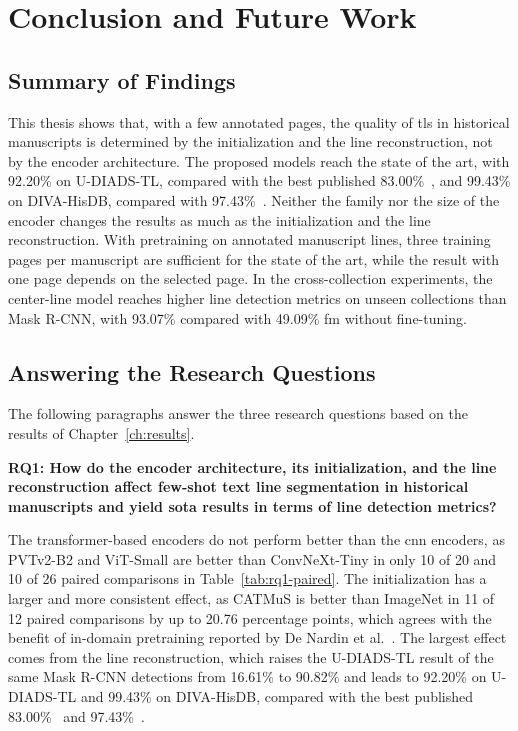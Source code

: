 \chapter{Conclusion and Future Work}
\label{ch:conclusions}

\section{Summary of Findings}
\label{sec:conclusions}

This thesis shows that, with a few annotated pages, the quality of \gls{tls} in historical manuscripts is determined by the initialization and the line reconstruction, not by the encoder architecture. The proposed models reach the state of the art, with 92.20\% on U-DIADS-TL, compared with the best published 83.00\%~\cite{Zottin_2025_FEST}, and 99.43\% on DIVA-HisDB, compared with 97.43\%~\cite{signals3030032}. Neither the family nor the size of the encoder changes the results as much as the initialization and the line reconstruction. With pretraining on annotated manuscript lines, three training pages per manuscript are sufficient for the state of the art, while the result with one page depends on the selected page. In the cross-collection experiments, the center-line model reaches higher line detection metrics on unseen collections than Mask R-CNN, with 93.07\% compared with 49.09\% \gls{fm} without fine-tuning.

\section{Answering the Research Questions}
\label{sec:disc-answers}\label{sec:disc-interpretation}\label{sec:disc-initialization}\label{sec:disc-representations}\label{sec:disc-previous}

The following paragraphs answer the three research questions based on the results of Chapter~\ref{ch:results}.

\textbf{RQ1: How do the encoder architecture, its initialization, and the line reconstruction affect few-shot text line segmentation in historical manuscripts and yield \gls{sota} results in terms of line detection metrics?}

The transformer-based encoders do not perform better than the \gls{cnn} encoders, as PVTv2-B2 and ViT-Small are better than ConvNeXt-Tiny in only 10 of 20 and 10 of 26 paired comparisons in Table~\ref{tab:rq1-paired}. The initialization has a larger and more consistent effect, as CATMuS is better than ImageNet in 11 of 12 paired comparisons by up to 20.76 percentage points, which agrees with the benefit of in-domain pretraining reported by De Nardin et al.~\cite{denardin2025indomain}. The largest effect comes from the line reconstruction, which raises the U-DIADS-TL result of the same Mask R-CNN detections from 16.61\% to 90.82\% and leads to 92.20\% on U-DIADS-TL and 99.43\% on DIVA-HisDB, compared with the best published 83.00\%~\cite{Zottin_2025_FEST} and 97.43\%~\cite{signals3030032}.

